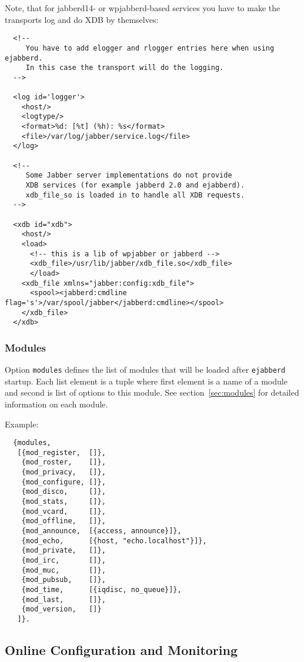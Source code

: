 \documentclass[a4paper,10pt]{article}
\newcommand{\term}[1]{\texttt{#1}}
\newcommand{\ejabberd}{\texttt{ejabberd}}
\begin{document}
Note, that for jabberd14- or wpjabberd-based services you have to make the
transports log and do XDB by themselves:
\begin{verbatim}
  <!--
     You have to add elogger and rlogger entries here when using ejabberd.
     In this case the transport will do the logging.
  -->

  <log id='logger'>
    <host/>
    <logtype/>
    <format>%d: [%t] (%h): %s</format>
    <file>/var/log/jabber/service.log</file>
  </log>

  <!--
     Some Jabber server implementations do not provide
     XDB services (for example jabberd 2.0 and ejabberd).
     xdb_file_so is loaded in to handle all XDB requests.
  -->

  <xdb id="xdb">
    <host/>
    <load>
      <!-- this is a lib of wpjabber or jabberd -->
      <xdb_file>/usr/lib/jabber/xdb_file.so</xdb_file>
      </load>
    <xdb_file xmlns="jabber:config:xdb_file">
      <spool><jabberd:cmdline flag='s'>/var/spool/jabber</jabberd:cmdline></spool>
    </xdb_file>
  </xdb>
\end{verbatim}


\subsubsection{Modules}
\label{sec:configmodules}

Option \term{modules} defines the list of modules that will be loaded after
\ejabberd{} startup.  Each list element is a tuple where first element is a
name of a module and second is list of options to this module.  See
section~\ref{sec:modules} for detailed information on each module.

Example:
\begin{verbatim}
  {modules,
   [{mod_register,  []},
    {mod_roster,    []},
    {mod_privacy,   []},
    {mod_configure, []},
    {mod_disco,     []},
    {mod_stats,     []},
    {mod_vcard,     []},
    {mod_offline,   []},
    {mod_announce,  [{access, announce}]},
    {mod_echo,      [{host, "echo.localhost"}]},
    {mod_private,   []},
    {mod_irc,       []},
    {mod_muc,       []},
    {mod_pubsub,    []},
    {mod_time,      [{iqdisc, no_queue}]},
    {mod_last,      []},
    {mod_version,   []}
   ]}.
\end{verbatim}


\subsection{Online Configuration and Monitoring}
\label{sec:onlineconfig}
\end{document}
